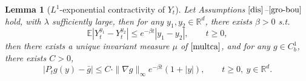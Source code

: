 \documentclass[11pt,reqno]{amsart}
\newtheorem{lemma}{\indent Lemma}[section]
\numberwithin{equation}{section}
\begin{document}
\begin{lemma}[$L^1$-exponential contractivity of $Y_t$]	\label{str-contra}
	Let  Assumptions $\ref{dis}$--$\ref{gro-bou}$ hold,    
	with  $\lambda$ sufficiently large,
	then for any	$y_1,y_2\in\mathbb R^{d}$, there exists $\beta>0$ s.t.
	\begin{equation}\label{strong-est}
		\mathbb E|Y_t^{y_1}-Y_t^{y_2}|
		\leq	e^{-\beta t}|y_1-y_2|,
		\qquad t\geq0,
	\end{equation}
	then there exists a unique invariant measure $\mu$ of $\eqref{multca}$, and for any $g\in C_b^1$, there exists $C>0$,
	\begin{equation}\label{L-gen-exp}
		\left| P_{t}g(y)-\bar{g}\right| \leq C\cdot  \|\nabla g\|_\infty  e^{-\beta t}(1+|y|),\qquad t\geq0, \ y\in \mathbb R^{d}.
	\end{equation}
\end{lemma}
\end{document}
